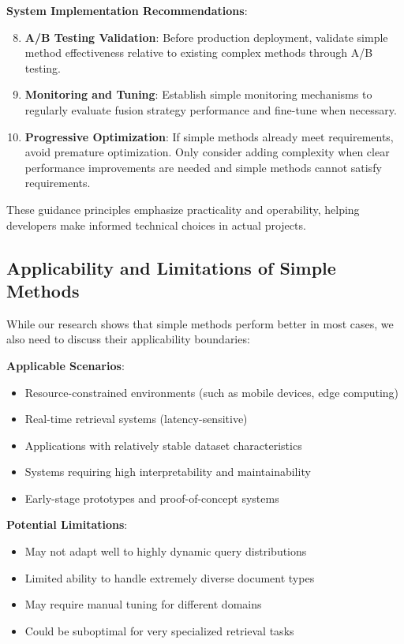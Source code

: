 \documentclass[letterpaper]{article} %
\begin{document}
\textbf{System Implementation Recommendations}:
\begin{enumerate}
\setcounter{enumi}{7}
\item \textbf{A/B Testing Validation}: Before production deployment, validate simple method effectiveness relative to existing complex methods through A/B testing.

\item \textbf{Monitoring and Tuning}: Establish simple monitoring mechanisms to regularly evaluate fusion strategy performance and fine-tune when necessary.

\item \textbf{Progressive Optimization}: If simple methods already meet requirements, avoid premature optimization. Only consider adding complexity when clear performance improvements are needed and simple methods cannot satisfy requirements.
\end{enumerate}

These guidance principles emphasize practicality and operability, helping developers make informed technical choices in actual projects.

\subsection{Applicability and Limitations of Simple Methods}

While our research shows that simple methods perform better in most cases, we also need to discuss their applicability boundaries:

\textbf{Applicable Scenarios}:
\begin{itemize}
\item Resource-constrained environments (such as mobile devices, edge computing)
\item Real-time retrieval systems (latency-sensitive)
\item Applications with relatively stable dataset characteristics
\item Systems requiring high interpretability and maintainability
\item Early-stage prototypes and proof-of-concept systems
\end{itemize}

\textbf{Potential Limitations}:
\begin{itemize}
\item May not adapt well to highly dynamic query distributions
\item Limited ability to handle extremely diverse document types
\item May require manual tuning for different domains
\item Could be suboptimal for very specialized retrieval tasks
\end{itemize}
\end{document}
